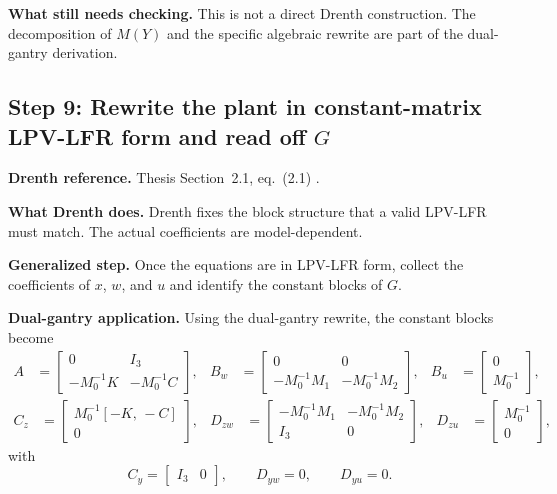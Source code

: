 ﻿\documentclass[11pt]{article}
\newcommand{\audititem}[2]{\par\smallskip\noindent\textbf{#1.} #2\par}
\begin{document}
\audititem{What still needs checking}{This is not a direct Drenth construction.
The decomposition of $M(Y)$ and the specific algebraic rewrite are part of the
dual-gantry derivation.}

\subsection{Step 9: Rewrite the plant in constant-matrix LPV-LFR form and read off $G$}

\audititem{Drenth reference}{Thesis Section~2.1, eq.~(2.1)
\cite{drenth2025thesis}.}

\audititem{What Drenth does}{Drenth fixes the block structure that a valid
LPV-LFR must match. The actual coefficients are model-dependent.}

\audititem{Generalized step}{Once the equations are in LPV-LFR form, collect the
coefficients of $x$, $w$, and $u$ and identify the constant blocks of $G$.}

\audititem{Dual-gantry application}{Using the dual-gantry rewrite, the constant
blocks become
\begin{align}
    A &=
    \begin{bmatrix}
        0 & I_3 \\
        -M_0^{-1}K & -M_0^{-1}C
    \end{bmatrix},
    &
    B_w &=
    \begin{bmatrix}
        0 & 0 \\
        -M_0^{-1}M_1 & -M_0^{-1}M_2
    \end{bmatrix},
    &
    B_u &=
    \begin{bmatrix}
        0 \\
        M_0^{-1}
    \end{bmatrix},
    \label{eqv:stateblocks}
\end{align}
\begin{align}
    C_z &=
    \begin{bmatrix}
        M_0^{-1}[-K,\,-C] \\
        0
    \end{bmatrix},
    &
    D_{zw} &=
    \begin{bmatrix}
        -M_0^{-1}M_1 & -M_0^{-1}M_2 \\
        I_3 & 0
    \end{bmatrix},
    &
    D_{zu} &=
    \begin{bmatrix}
        M_0^{-1} \\
        0
    \end{bmatrix},
    \label{eqv:loopblocks}
\end{align}
with
\begin{equation}
    C_y = \begin{bmatrix} I_3 & 0 \end{bmatrix},
    \qquad
    D_{yw} = 0,
    \qquad
    D_{yu} = 0.
    \label{eqv:outblocks}
\end{equation}}
\end{document}
